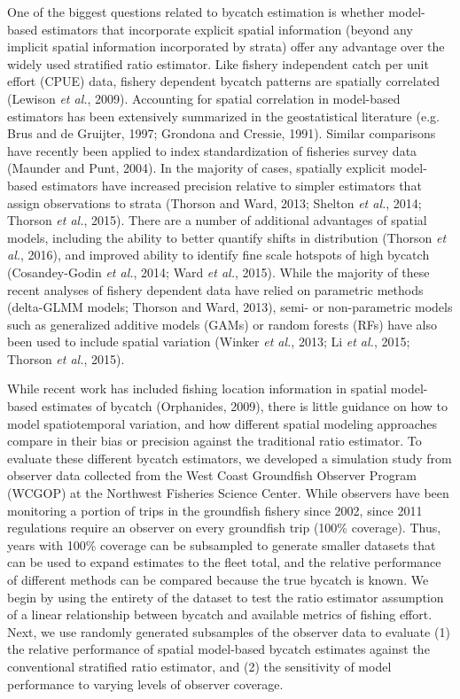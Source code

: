 \documentclass[]{article}
\begin{document}
One of the biggest questions related to bycatch estimation is whether
model-based estimators that incorporate explicit spatial information
(beyond any implicit spatial information incorporated by strata) offer
any advantage over the widely used stratified ratio estimator. Like
fishery independent catch per unit effort (CPUE) data, fishery dependent
bycatch patterns are spatially correlated (Lewison \emph{et al.}, 2009).
Accounting for spatial correlation in model-based estimators has been
extensively summarized in the geostatistical literature (e.g. Brus and
de Gruijter, 1997; Grondona and Cressie, 1991). Similar comparisons have
recently been applied to index standardization of fisheries survey data
(Maunder and Punt, 2004). In the majority of cases, spatially explicit
model-based estimators have increased precision relative to simpler
estimators that assign observations to strata (Thorson and Ward, 2013;
Shelton \emph{et al.}, 2014; Thorson \emph{et al.}, 2015). There are a
number of additional advantages of spatial models, including the ability
to better quantify shifts in distribution (Thorson \emph{et al.}, 2016),
and improved ability to identify fine scale hotspots of high bycatch
(Cosandey-Godin \emph{et al.}, 2014; Ward \emph{et al.}, 2015). While
the majority of these recent analyses of fishery dependent data have
relied on parametric methods (delta-GLMM models; Thorson and Ward,
2013), semi- or non-parametric models such as generalized additive
models (GAMs) or random forests (RFs) have also been used to include
spatial variation (Winker \emph{et al.}, 2013; Li \emph{et al.}, 2015;
Thorson \emph{et al.}, 2015).

While recent work has included fishing location information in spatial
model-based estimates of bycatch (Orphanides, 2009), there is little
guidance on how to model spatiotemporal variation, and how different
spatial modeling approaches compare in their bias or precision against
the traditional ratio estimator. To evaluate these different bycatch
estimators, we developed a simulation study from observer data collected
from the West Coast Groundfish Observer Program (WCGOP) at the Northwest
Fisheries Science Center. While observers have been monitoring a portion
of trips in the groundfish fishery since 2002, since 2011 regulations
require an observer on every groundfish trip (100\% coverage). Thus,
years with 100\% coverage can be subsampled to generate smaller datasets
that can be used to expand estimates to the fleet total, and the
relative performance of different methods can be compared because the
true bycatch is known. We begin by using the entirety of the dataset to
test the ratio estimator assumption of a linear relationship between
bycatch and available metrics of fishing effort. Next, we use randomly
generated subsamples of the observer data to evaluate (1) the relative
performance of spatial model-based bycatch estimates against the
conventional stratified ratio estimator, and (2) the sensitivity of
model performance to varying levels of observer coverage.
\end{document}

